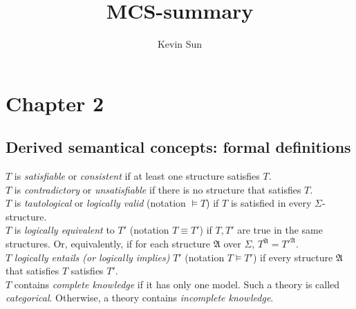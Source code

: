 \documentclass[10pt,a4paper]{article}
\author{Kevin Sun}
\title{MCS-summary}
\theoremstyle{definition}
\begin{document}
\maketitle
\tableofcontents
\newpage
\section{Chapter 2}
\subsection{Derived semantical concepts: formal definitions}
$T$ is \textit{satisfiable} or \textit{consistent} if at least one structure satisfies $T$. \\

\noindent
$T$ is \textit{contradictory} or \textit{unsatisfiable} if there is no structure that satisfies $T$.\\

\noindent
$T$ is \textit{tautological} or \textit{logically valid} (notation $\models T$) if $T$ is satisfied in every $\Sigma$-structure. \\

\noindent
$T$ is \textit{logically equivalent} to $T'$ (notation $T \equiv T'$) if $T,T'$ are true in the same structures. Or, equivalently, if for each structure $\mathfrak{A}$ over $\Sigma$, $T^\mathfrak{A} = {T'}^\mathfrak{A}$. \\

\noindent
$T$ \textit{logically entails (or logically implies)} $T'$ (notation $T \models T'$) if every structure $\mathfrak{A}$ that satisfies $T$ satisfies $T'$. \\

\noindent
$T$ contains \textit{complete knowledge} if it has only one model. Such a theory is called \textit{categorical}. Otherwise, a theory contains \textit{incomplete knowledge}.
\end{document}

